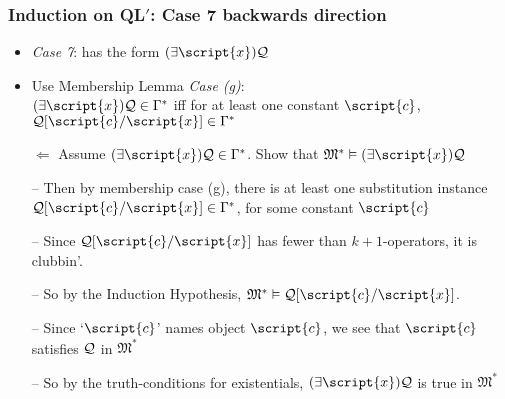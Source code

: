 \begin{frame}
\frametitle{Induction on QL$'$: Case 7 backwards direction}

\begin{itemize}[<+->]

\item \emph{Case 7}:  has the form $\qt{\exists}{\script{x}} \metav{Q}$ %

\item Use Membership Lemma \emph{Case (g)}: \\ $\qt{\exists}{\script{x}} \metav{Q} \in \Gamma^{\ast}$ iff for at least one constant $\script{c}$, $\metav{Q}[\script{c}/\script{x}] \in \Gamma^{\ast}$

\bigskip


\item[$\Leftarrow$] Assume $\qt{\exists}{\script{x}} \metav{Q} \in \Gamma^{\ast}$. Show that $\mathfrak{M}^{\ast} \entails \qt{\exists}{\script{x}} \metav{Q}$

\item[] -- Then by membership case (g), there is at least one substitution instance $\metav{Q}\substitute{\script{x}}{\script{c}} \in \Gamma^{\ast}$, for some constant $\script{c}$

\item[] -- Since $\metav{Q}\substitute{\script{x}}{\script{c}}$ has fewer than $k+1$-operators, it is clubbin'. 
\item[] -- So by the Induction Hypothesis, $\mathfrak{M}^{\ast} \entails \metav{Q}\substitute{\script{x}}{\script{c}}$. 

\item[] -- Since `$\script{c}$' names object $\script{c}$, we see that $\script{c}$ satisfies $\mathcal{Q}$ in $\mathfrak{M}^{\ast}$

\item[] -- So by the truth-conditions for existentials, $\qt{\exists}{\script{x}} \metav{Q}$ is true in $\mathfrak{M}^{\ast}$

\end{itemize}
\end{frame}


